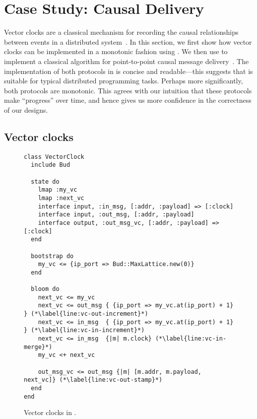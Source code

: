 \section{Case Study: Causal Delivery}
\label{sec:causal}

Vector clocks are a classical mechanism for recording the causal relationships
between events in a distributed system~\cite{Fidge1988,Mattern1989}. In this
section, we first show how vector clocks can be implemented in a monotonic
fashion using \lang. We then use \lang to implement a classical algorithm for
point-to-point causal message delivery~\cite{Schiper1989}. The implementation of
both protocols in \lang is concise and readable---this suggests that \lang is
suitable for typical distributed programming tasks. Perhaps more significantly,
both protocols are monotonic. This agrees with our intuition that these
protocols make ``progress'' over time, and hence gives us more confidence in the
correctness of our designs.


\subsection{Vector clocks}
\begin{figure}[t]
\begin{scriptsize}
\begin{lstlisting}
class VectorClock
  include Bud

  state do
    lmap :my_vc
    lmap :next_vc
    interface input, :in_msg, [:addr, :payload] => [:clock]
    interface input, :out_msg, [:addr, :payload]
    interface output, :out_msg_vc, [:addr, :payload] => [:clock]
  end

  bootstrap do
    my_vc <= {ip_port => Bud::MaxLattice.new(0)}
  end

  bloom do
    next_vc <= my_vc
    next_vc <= out_msg { {ip_port => my_vc.at(ip_port) + 1} } (*\label{line:vc-out-increment}*)
    next_vc <= in_msg  { {ip_port => my_vc.at(ip_port) + 1} } (*\label{line:vc-in-increment}*)
    next_vc <= in_msg  {|m| m.clock} (*\label{line:vc-in-merge}*)
    my_vc <+ next_vc

    out_msg_vc <= out_msg {|m| [m.addr, m.payload, next_vc]} (*\label{line:vc-out-stamp}*)
  end
end
\end{lstlisting}
\end{scriptsize}
\caption{Vector clocks in \lang.}
\label{fig:vector-clock-src}
\end{figure}

